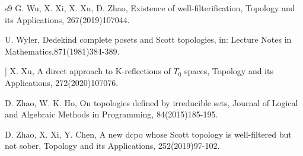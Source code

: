 \documentclass[preprint,12pt]{elsarticle}
\numberwithin{equation}{section}
\begin{document}
\begin{thebibliography}{s9}
 G. Wu, X. Xi, X. Xu, D. Zhao, Existence of well-filterification, Topology and its Applications, 267(2019)107044.

 U. Wyler, Dedekind complete posets and Scott topologies, in: Lecture Notes in Mathematics,871(1981)384-389.

] X. Xu, A direct approach to K-reflections of $T_{0}$ spaces, Topology and its Applications, 272(2020)107076.

 D. Zhao, W. K. Ho, On topologies defined by irreducible sets, Journal of Logical and Algebraic Methods in Programming, 84(2015)185-195.

 D. Zhao, X. Xi, Y. Chen, A new dcpo whose Scott topology is well-filtered but not sober, Topology and its Applications, 252(2019)97-102.







\end{thebibliography}
\end{document}
